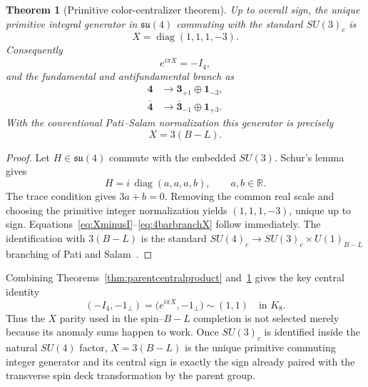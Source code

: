 \documentclass[11pt]{article}
\newtheorem{theorem}{Theorem}[section]
\theoremstyle{definition}\newtheorem{definition}[theorem]{Definition}
\theoremstyle{remark}\newtheorem{remark}[theorem]{Remark}\newtheorem{conjecture}[theorem]{Conjecture}
\begin{document}
\begin{theorem}[Primitive color-centralizer theorem]\label{thm:colorcentralizer}
Up to overall sign, the unique primitive integral generator in $\mathfrak{su}(4)$ commuting with the standard $SU(3)_c$ is
\begin{equation}\label{eq:Xcentralizer}
 \boxed{X=\operatorname{diag}(1,1,1,-3).}
\end{equation}
Consequently
\begin{equation}\label{eq:XminusI}
 \boxed{e^{i\pi X}=-I_4,}
\end{equation}
and the fundamental and antifundamental branch as
\begin{align}
 \mathbf4&\longrightarrow \mathbf3_{+1}\oplus\mathbf1_{-3},\label{eq:4branchX}\\
 \bar{\mathbf4}&\longrightarrow \bar{\mathbf3}_{-1}\oplus\mathbf1_{+3}.\label{eq:4barbranchX}
\end{align}
With the conventional Pati--Salam normalization this generator is precisely
\begin{equation}
 \boxed{X=3(B-L).}
\end{equation}
\end{theorem}
\begin{proof}
Let $H\in\mathfrak{su}(4)$ commute with the embedded $SU(3)$. Schur's lemma gives
\begin{equation}
 H=i\,\operatorname{diag}(a,a,a,b),\qquad a,b\in\mathbb R.
\end{equation}
The trace condition gives $3a+b=0$. Removing the common real scale and choosing the primitive integer normalization yields $(1,1,1,-3)$, unique up to sign. Equations~\eqref{eq:XminusI}--\eqref{eq:4barbranchX} follow immediately. The identification with $3(B-L)$ is the standard $SU(4)_c\to SU(3)_c\times U(1)_{B-L}$ branching of Pati and Salam~\cite{PatiSalam1974}.
\end{proof}

Combining Theorems~\ref{thm:parentcentralproduct} and~\ref{thm:colorcentralizer} gives the key central identity
\begin{equation}\label{eq:parentBLcenter}
 \boxed{
 (-I_4,-1_\perp)
 =\bigl(e^{i\pi X},-1_\perp\bigr)
 \sim(1,1)
 \quad\text{in }K_8.}
\end{equation}
Thus the $X$ parity used in the spin--$B-L$ completion is not selected merely because its anomaly sums happen to work. Once $SU(3)_c$ is identified inside the natural $SU(4)$ factor, $X=3(B-L)$ is the unique primitive commuting integer generator and its central sign is exactly the sign already paired with the transverse spin deck transformation by the parent group.
\end{document}
